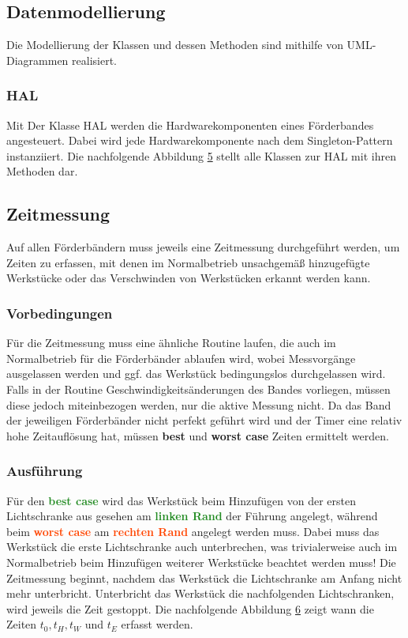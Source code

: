 \documentclass[a4paper, 11pt]{article}
\begin{document}
\newpage

\subsection{Datenmodellierung}
Die Modellierung der Klassen und dessen Methoden sind mithilfe von UML-Diagrammen realisiert.
\subsubsection{HAL}
Mit Der Klasse HAL werden die Hardwarekomponenten eines Förderbandes angesteuert. Dabei wird jede Hardwarekomponente nach dem Singleton-Pattern instanziiert. Die nachfolgende Abbildung \hyperref[sec:umlhal]{5} stellt alle Klassen zur HAL mit ihren Methoden dar.
\newpage

\label{sec:umlhal}
\newpage

\subsection{Zeitmessung}
Auf allen Förderbändern muss jeweils eine Zeitmessung durchgeführt werden, um Zeiten zu erfassen, mit denen im Normalbetrieb unsachgemäß hinzugefügte Werkstücke oder das Verschwinden von Werkstücken erkannt werden kann.

\subsubsection{Vorbedingungen}
Für die Zeitmessung muss eine ähnliche Routine laufen, die auch im Normalbetrieb für die Förderbänder ablaufen wird, wobei Messvorgänge ausgelassen werden und ggf. das Werkstück bedingungslos durchgelassen wird. Falls in der Routine Geschwindigkeitsänderungen des Bandes vorliegen, müssen diese jedoch miteinbezogen werden, nur die aktive Messung nicht.
Da das Band der jeweiligen Förderbänder nicht perfekt geführt wird und der Timer eine relativ hohe Zeitauflösung hat, müssen \textbf{best} und \textbf{worst case} Zeiten ermittelt werden. 

\subsubsection{Ausführung}
Für den \textbf{\textcolor{ForestGreen}{best case}} wird das Werkstück beim Hinzufügen von der ersten Lichtschranke aus gesehen am \textbf{\textcolor{ForestGreen}{linken Rand}} der Führung angelegt, während beim \textbf{\textcolor{OrangeRed}{worst case}} am \textbf{\textcolor{OrangeRed}{rechten Rand}} angelegt werden muss. Dabei muss das Werkstück die erste Lichtschranke auch unterbrechen, was trivialerweise auch im Normalbetrieb beim Hinzufügen weiterer Werkstücke beachtet werden muss! Die Zeitmessung beginnt, nachdem das Werkstück die Lichtschranke am Anfang nicht mehr unterbricht. Unterbricht das Werkstück die nachfolgenden Lichtschranken, wird jeweils die Zeit gestoppt. Die nachfolgende Abbildung \hyperref[sec:Messpunkte]{6} zeigt wann die Zeiten $t_0, t_H, t_W$ und $t_E$ erfasst werden.
\end{document}
